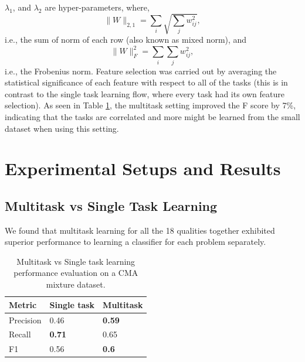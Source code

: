\documentclass[11pt,twocolumn,varwidth=true,a4paper,fleqn]{article}
\begin{document}
$\lambda_1$, and $\lambda_2$ are hyper-parameters, where,
\\
\begin{equation*}
\|W\|_{2,1} = \sum_i \sqrt{\sum_j w_{ij}^2},
\end{equation*}
i.e., the sum of norm of each row (also known as mixed norm), and
\begin{equation*}
\|W\|^2_F = \sum_i{\sum_j w_{ij}^2},
\end{equation*}
i.e., the Frobenius norm.
Feature selection was carried out by averaging the statistical significance of
each feature with respect to all of the tasks (this is in contrast to the single
task learning flow, where every task had its own feature selection). As seen in
Table \ref{MultitaskVsSeparated}, the multitask setting improved the F score by
7\%, indicating that the tasks are correlated and more might be learned
from the small dataset when using this setting.

\section{Experimental Setups and Results}
\subsection{Multitask vs Single Task Learning}
We found that multitask learning for all the 18 qualities together exhibited superior
performance to learning a classifier for each problem separately.
\begin{table}[ht]
\centering
\begin{tabular}{|p{1.8cm}|p{1.8cm}|p{1.8cm}|}
\hline
Metric&Single task&Multitask\\\hline
Precision&0.46&\textbf{0.59}\\\hline
Recall&\textbf{0.71}&0.65\\\hline
F1&0.56&\textbf{0.6}\\\hline
\end{tabular}
\caption{Multitask vs Single task learning performance evaluation on a CMA mixture
dataset.}
\label{MultitaskVsSeparated}
\end{table}
\end{document}
